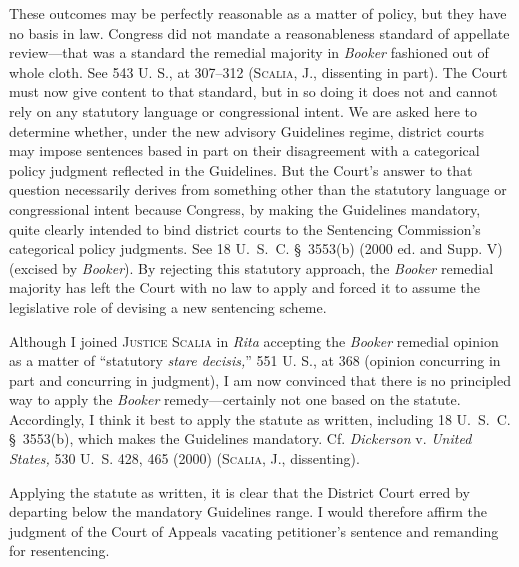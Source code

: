   These outcomes may be perfectly reasonable as a matter of policy, but
they have no basis in law. Congress did not mandate a reasonableness
standard of appellate review---that was a standard the remedial
majority in \emph{Booker} fashioned out of whole cloth. See 543 U. S.,
at 307--312 (\textsc{Scalia,} J., dissenting in part). The Court must now
give content to that standard, but in so doing it does not and cannot
rely on any statutory language or congressional intent. We are asked
here to determine whether, under the new advisory Guidelines regime,
district courts may impose sentences based in part on their disagreement
with a categorical policy judgment reflected in the Guidelines. But the
Court's answer to that question necessarily derives from something
other than the statutory language or congressional intent because
Congress, by making the Guidelines mandatory, quite clearly intended
to bind district courts to the Sentencing Commission's categorical
policy judgments. See 18 U.~S.~C. \S~3553(b) (2000 ed. and Supp.
V) (excised by \emph{Booker}). By rejecting this statutory approach, the
\emph{Booker} remedial majority has left the Court with no law to apply and
forced it to assume the legislative role of devising a new sentencing
scheme.\newpage 

  Although I joined \textsc{Justice Scalia} in \emph{Rita} accepting the
\emph{Booker} remedial opinion as a matter of ``statutory \emph{stare
decisis,}'' 551 U. S., at 368 (opinion concurring in part and
concurring in judgment), I am now convinced that there is no
principled way to apply the \emph{Booker} remedy---certainly not one based
on the statute. Accordingly, I think it best to apply the statute as
written, including 18 U.~S.~C. \S~3553(b), which makes the Guidelines
mandatory. Cf. \emph{Dickerson} v. \emph{United States,} 530 U.~S. 428, 465
(2000) (\textsc{Scalia,} J., dissenting).

  Applying the statute as written, it is clear that the District
Court erred by departing below the mandatory Guidelines range. I
would therefore affirm the judgment of the Court of Appeals vacating
petitioner's sentence and remanding for resentencing.
